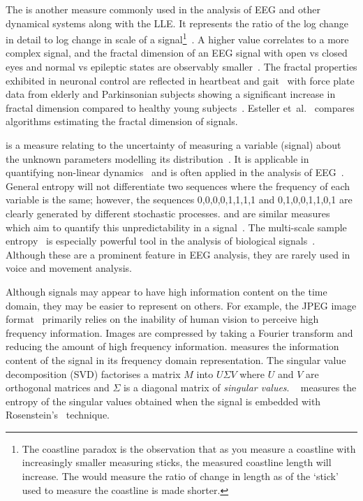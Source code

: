 \documentclass[12pt, twoside]{book}
\renewcommand\emph[1]{\textit{\color{USred}{#1}}}
\begin{document}

The \emph{fractal dimension} is another measure commonly used in the analysis of EEG and other dynamical systems along with the LLE. It represents the ratio of the log change in detail to log change in scale of a signal\footnote{The coastline paradox is the observation that as you measure a coastline with increasingly smaller measuring sticks, the measured coastline length will increase. The \emph{fractal dimension} would measure the ratio of change in length as of the `stick' used to measure the coastline is made shorter.}~\cite{mandelbrot1967long}. A higher value correlates to a more complex signal, and the fractal dimension of an EEG signal with open vs closed eyes and normal vs epileptic states are observably smaller~\cite{eegfractal, seizuredimensions}. The fractal properties exhibited in neuronal control are reflected in heartbeat and gait~\cite{fractalgait} with force plate data from elderly and Parkinsonian subjects showing a significant increase in fractal dimension compared to healthy young subjects~\cite{hfdcop, fractalpd, fractalbalance}. Esteller et~al.~\cite{fractaldimensions} compares algorithms estimating the fractal dimension of signals.


\emph{Fisher Information} is a measure relating to the uncertainty of measuring a variable (signal) about the unknown parameters modelling its distribution~\cite{fisherentropy}. It is applicable in quantifying non-linear dynamics~\cite{fisherinfo} and is often applied in the analysis of EEG~\cite{fisherinfo2}. General entropy will not differentiate two sequences where the frequency of each variable is the same; however, the sequences 0,0,0,0,1,1,1,1 and 0,1,0,0,1,1,0,1 are clearly generated by different stochastic processes. \emph{Approximate} and \emph{sample entropy} are similar measures which aim to quantify this unpredictability in a signal~\cite{apsampentropy, apentropy}. The multi-scale sample entropy~\cite{multiscaleentropy} is especially powerful tool in the analysis of biological signals~\cite{samplegaitmulti, sampleheart}. Although these are a prominent feature in EEG analysis, they are rarely used in voice and movement analysis. 

Although signals may appear to have high information content on the time domain, they may be easier to represent on others. For example, the JPEG image format~\cite{jpeg} primarily relies on the inability of human vision to perceive high frequency information. Images are compressed by taking a Fourier transform and reducing the amount of high frequency information. \emph{Spectral entropy} measures the information content of the signal in its frequency domain representation. The singular value decomposition (SVD) factorises a matrix $M$ into $U\Sigma V$ where $U$ and $V$ are orthogonal matrices and $\Sigma$ is a diagonal matrix of \textit{singular values}.  \emph{SVD entropy}~\cite{svdentropy} measures the entropy of the singular values obtained when the signal is embedded with Rosenstein's~\cite{rosenstein1993practicallyapunov} technique. 
\end{document}
